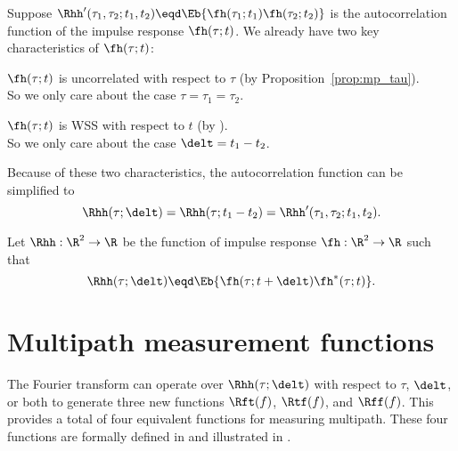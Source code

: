 Suppose 
$\Rhh'(\tau_1,\tau_2;t_1,t_2)\eqd\Eb{\fh(\tau_1;t_1)\fh(\tau_2;t_2)}$
is the autocorrelation function of the impulse response $\fh(\tau;t)$.
We already have two key characteristics of $\fh(\tau;t)$:
\begin{enume}
  \item $\fh(\tau;t)$ is uncorrelated with respect to $\tau$
        (by Proposition~\ref{prop:mp_tau}).\\
        So we only care about the case $\tau=\tau_1=\tau_2$.
  \item $\fh(\tau;t)$ is WSS with respect to $t$
        (by ). \\
        So we only care about the case $\delt=t_1-t_2$.
\end{enume}
Because of these two characteristics, the autocorrelation function
can be simplified to 
\[ \Rhh(\tau;\delt)=\Rhh(\tau;t_1-t_2)=\Rhh'(\tau_1,\tau_2;t_1,t_2).\]

\begin{definition}
\label{def:mp_Rhh}
Let $\Rhh:\R^2\to\R$ be the  function
of impulse response $\fh:\R^2\to\R$ such that
  \[ \Rhh(\tau;\delt)\eqd\Eb{\fh(\tau;t+\delt)\fh^\ast(\tau;t)}. \]
\end{definition}

\section{Multipath measurement functions}
The Fourier transform can operate over $\Rhh(\tau;\delt)$
with respect to $\tau$, $\delt$, or both to generate three
new functions $\Rft(f)$, $\Rtf(f)$, and $\Rff(f)$.
This provides a total of four equivalent functions for 
measuring multipath.
These four functions are formally defined in 
 and illustrated in .

